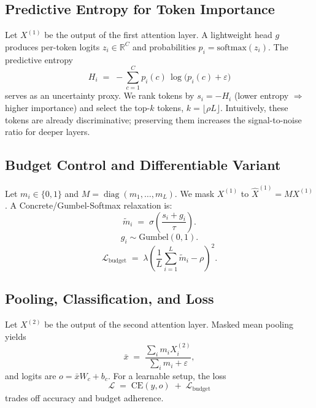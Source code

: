 \documentclass{article}
\newcommand{\Lseq}{L}
\begin{document}
\subsection{Predictive Entropy for Token Importance}
Let $X^{(1)}$ be the output of the first attention layer. A lightweight head $g$ produces per-token logits $z_i\in\mathbb{R}^C$ and probabilities $p_i=\mathrm{softmax}(z_i)$. The predictive entropy
\begin{equation}
H_i \;=\; -\sum_{c=1}^C p_i(c)\,\log\big(p_i(c)+\varepsilon\big)
\end{equation}
serves as an uncertainty proxy. We rank tokens by $s_i=-H_i$ (lower entropy $\Rightarrow$ higher importance) and select the top-$k$ tokens, $k=\lfloor \rho \Lseq\rfloor$. Intuitively, these tokens are already discriminative; preserving them increases the signal-to-noise ratio for deeper layers.

\subsection{Budget Control and Differentiable Variant}
Let $m_i\in\{0,1\}$ and $M=\operatorname{diag}(m_1,\dots,m_L)$. We mask $X^{(1)}$ to $\hat{X}^{(1)}=M X^{(1)}$.
A Concrete/Gumbel-Softmax relaxation is:
\begin{equation}
\tilde{m}_i \;=\; \sigma\!\left(\frac{s_i + g_i}{\tau}\right).
\label{eq:gumbel-gate}
\end{equation}
\begin{equation}
g_i \sim \mathrm{Gumbel}(0,1).
\label{eq:gumbel-noise}
\end{equation}
\begin{equation}
\mathcal{L}_{\text{budget}} \;=\; \lambda\!\left(\frac{1}{L}\sum_{i=1}^L \tilde{m}_i - \rho\right)^2.
\label{eq:budget}
\end{equation}


\subsection{Pooling, Classification, and Loss}
Let $X^{(2)}$ be the output of the second attention layer. Masked mean pooling yields
\[
\bar{x} \;=\; \frac{\sum_i m_i X^{(2)}_i}{\sum_i m_i + \varepsilon},
\]
and logits are $o=\bar{x} W_c + b_c$. For a learnable setup, the loss
\begin{equation}
\mathcal{L} \;=\; \mathrm{CE}(y,o) \;+\; \mathcal{L}_{\text{budget}}
\end{equation}
trades off accuracy and budget adherence.
\end{document}
